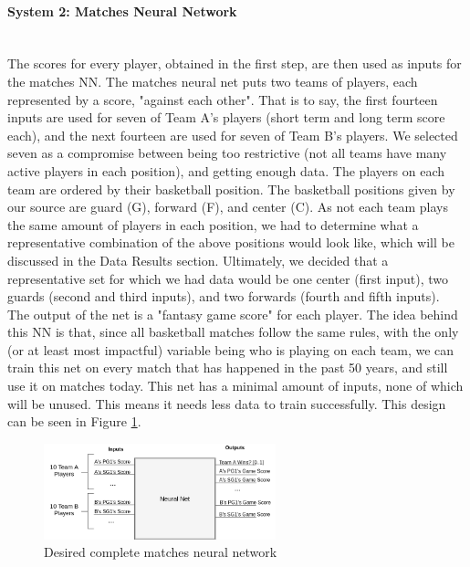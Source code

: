 \paragraph{System 2: Matches Neural Network}\mbox{}\\
The scores for every player, obtained in the first step, are then used as inputs for the matches NN. The matches neural net puts two teams of players, each represented by a score, "against each other". That is to say, the first fourteen inputs are used for seven of Team A's players (short term and long term score each), and the next fourteen are used for seven of Team B's players. We selected seven as a compromise between being too restrictive (not all teams have many active players in each position), and getting enough data. The players on each team are ordered by their basketball position. The basketball positions given by our source are guard (G), forward (F), and center (C). As not each team plays the same amount of players in each position, we had to determine what a representative combination of the above positions would look like, which will be discussed in the Data Results section. Ultimately, we decided that a representative set for which we had data would be one center (first input), two guards (second and third inputs), and two forwards (fourth and fifth inputs).\\
The output of the net is a "fantasy game score" for each player. The idea behind this NN is that, since all basketball matches follow the same rules, with the only (or at least most impactful) variable being who is playing on each team, we can train this net on every match that has happened in the past 50 years, and still use it on matches today. This net has a minimal amount of inputs, none of which will be unused. This means it needs less data to train successfully. This design can be seen in Figure \ref{fig:neural_network_full}.

\begin{figure}[ht]
    \centering
    \includegraphics[width=0.6\textwidth]{figures/neural_network_full}
    \caption{Desired complete matches neural network}
    \label{fig:neural_network_full}
\end{figure}

